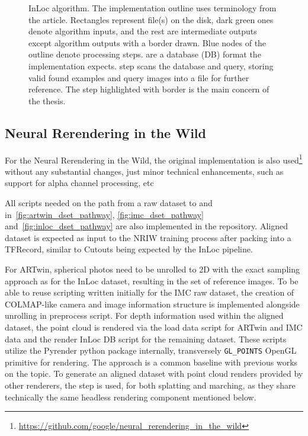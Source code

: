 \begin{figure}
    \centering
    
    \caption[InLoc algorithm]{InLoc algorithm. The implementation
    outline uses terminology from the article. Rectangles represent file(s) on the disk,
    dark green ones denote algorithm inputs, and the rest are intermediate outputs except
    algorithm outputs with a border drawn. Blue nodes of the outline denote processing
    steps.   are a database (DB) format the implementation expects.
     step scans the database and query, storing valid found examples and
    query images into a file for further reference. The  step highlighted
    with border is the main concern of the thesis.}
    \label{fig:inloc_pathway}
\end{figure}

\subsection{Neural Rerendering in the Wild}

For the Neural Rerendering in the Wild, the original implementation is also
used\footnote{\url{https://github.com/google/neural_rerendering_in_the_wild}} without any
substantial changes, just minor technical enhancements, such as support for alpha channel
processing, etc

All scripts needed on the path from a raw dataset to  and 
in~\cref{fig:artwin_dset_pathway}, \cref{fig:imc_dset_pathway}
and~\cref{fig:inloc_dset_pathway} are also implemented in the repository. Aligned dataset
is expected as input to the NRIW training process after packing into a TFRecord, similar
to Cutouts being expected by the InLoc pipeline.

For ARTwin, spherical photos need to be unrolled to 2D with the exact sampling approach as
for the InLoc dataset, resulting in the set of reference images.  To be able to reuse
scripting written initially for the IMC raw dataset, the creation of COLMAP-like camera
and image information structure is implemented alongside unrolling in preprocess script.
For depth information used within the aligned dataset, the point cloud is rendered via the
load data script for ARTwin and IMC data and the render InLoc DB script for the remaining
dataset. These scripts utilize the Pyrender python package internally, transversely
\verb|GL_POINTS| OpenGL primitive for rendering. The approach is a common baseline with
previous works on the topic.  To generate an aligned dataset with point cloud renders
provided by other renderers, the  step is used, for both splatting
and marching, as they share technically the same headless rendering component mentioned
below.

